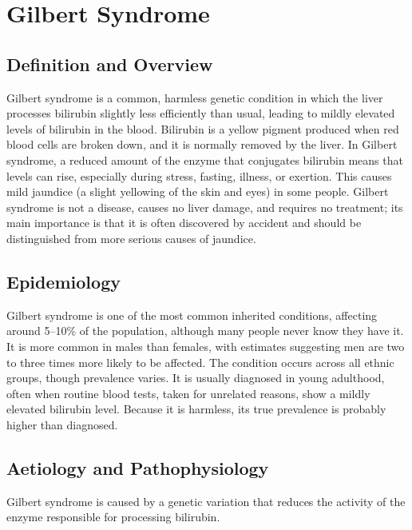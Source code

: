 \chapter{Gilbert Syndrome}

\section*{Definition and Overview}
Gilbert syndrome is a common, harmless genetic condition in which the liver processes bilirubin slightly less efficiently than usual, leading to mildly elevated levels of bilirubin in the blood. Bilirubin is a yellow pigment produced when red blood cells are broken down, and it is normally removed by the liver. In Gilbert syndrome, a reduced amount of the enzyme that conjugates bilirubin means that levels can rise, especially during stress, fasting, illness, or exertion. This causes mild jaundice (a slight yellowing of the skin and eyes) in some people. Gilbert syndrome is not a disease, causes no liver damage, and requires no treatment; its main importance is that it is often discovered by accident and should be distinguished from more serious causes of jaundice.

\section*{Epidemiology}
Gilbert syndrome is one of the most common inherited conditions, affecting around 5--10\% of the population, although many people never know they have it. It is more common in males than females, with estimates suggesting men are two to three times more likely to be affected. The condition occurs across all ethnic groups, though prevalence varies. It is usually diagnosed in young adulthood, often when routine blood tests, taken for unrelated reasons, show a mildly elevated bilirubin level. Because it is harmless, its true prevalence is probably higher than diagnosed.

\section*{Aetiology and Pathophysiology}
Gilbert syndrome is caused by a genetic variation that reduces the activity of the enzyme responsible for processing bilirubin.

